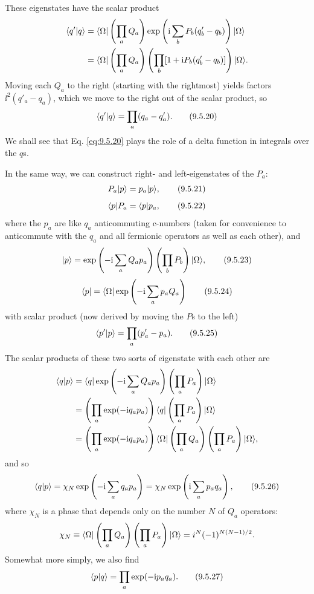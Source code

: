 These eigenstates have the scalar product
\begin{align*}
\langle q' | q\rangle
&=\langle \Omega\rvert\left(\prod_aQ_a\right)
 \exp\left(\mathrm{i}\sum_bP_b(q'_b-q_b)\right)\lvert \Omega\rangle\\
&=\langle \Omega\rvert\left(\prod_aQ_a\right)
 \left(\prod_b[1+\mathrm{i} P_b(q'_b-q_b)]\right)\lvert \Omega\rangle.
\end{align*}
Moving each $Q_a$ to the right (starting with the rightmost) yields factors
$\ii^2(q'_a-q_a)$, which we move to the right out of the scalar product, so
\begin{equation}
\langle q' | q\rangle=\prod_a(q_a-q'_a).
\tag{9.5.20}\label{eq:9.5.20}
\end{equation}
We shall see that Eq. \eqref{eq:9.5.20} plays the role of a delta function in integrals
over the $q$s.

In the same way, we can construct right- and left-eigenstates of the $P_a$:
\begin{equation}
P_a\lvert p\rangle=p_a\lvert p\rangle,
\tag{9.5.21}\label{eq:9.5.21}
\end{equation}
\begin{equation}
\langle p\rvert P_a=\langle p\rvert p_a,
\tag{9.5.22}\label{eq:9.5.22}
\end{equation}
where the $p_a$ are like $q_a$ anticommuting c-numbers (taken for convenience
to anticommute with the $q_a$ and all fermionic operators as well as each
other), and
\begin{equation}
\lvert p\rangle=\exp\left(-\mathrm{i}\sum_aQ_ap_a\right)
 \left(\prod_bP_b\right)\lvert \Omega\rangle,
\tag{9.5.23}\label{eq:9.5.23}
\end{equation}
\begin{equation}
\langle p\rvert=\langle \Omega\rvert\exp\left(-\mathrm{i}\sum_a p_aQ_a\right)
\tag{9.5.24}\label{eq:9.5.24}
\end{equation}
with scalar product (now derived by moving the $P$s to the left)
\begin{equation}
\langle p' | p\rangle=\prod_a(p'_a-p_a).
\tag{9.5.25}\label{eq:9.5.25}
\end{equation}
The scalar products of these two sorts of eigenstate with each other are
\begin{align*}
\langle q | p\rangle
&=\langle q\rvert\exp\left(-\mathrm{i}\sum_aQ_ap_a\right)
 \left(\prod_aP_a\right)\lvert \Omega\rangle\\
&=\left(\prod_a\exp(-\mathrm{i} q_ap_a)\right)
 \langle q\rvert\left(\prod_aP_a\right)\lvert \Omega\rangle\\
&=\left(\prod_a\exp(-\mathrm{i} q_ap_a)\right)
 \langle \Omega\rvert\left(\prod_aQ_a\right)
 \left(\prod_aP_a\right)\lvert \Omega\rangle,
\end{align*}
and so
\begin{equation}
\langle q | p\rangle=\chi_N\exp\left(-\mathrm{i}\sum_aq_ap_a\right)
=\chi_N\exp\left(\mathrm{i}\sum_ap_aq_a\right),
\tag{9.5.26}\label{eq:9.5.26}
\end{equation}
where $\chi_N$ is a phase that depends only on the number $N$ of $Q_a$
operators:
\[
\chi_N\equiv\langle \Omega\rvert\left(\prod_aQ_a\right)
 \left(\prod_aP_a\right)\lvert \Omega\rangle
=i^N(-1)^{N(N-1)/2}.
\]
Somewhat more simply, we also find
\begin{equation}
\langle p | q\rangle=\prod_a\exp(-\mathrm{i} p_aq_a).
\tag{9.5.27}\label{eq:9.5.27}
\end{equation}

